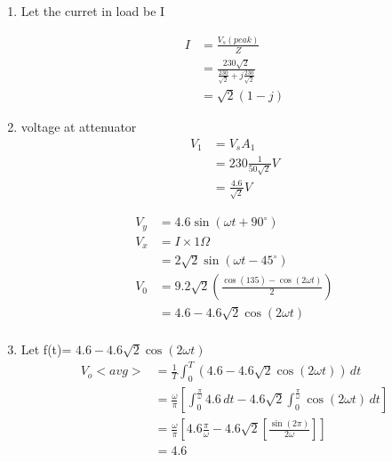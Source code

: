 \documentclass[journal,12pt,twocolumn]{IEEEtran}
\theoremstyle{remark}
\begin{document}

\begin{enumerate}
    \item 

Let the curret in load be I

\begin{center}
\begin{align}
     I &=\frac{V_s(peak)}{Z}\\
     &=\frac{230\sqrt{2}}{\frac{230}{\sqrt{2}}+j\frac{230}{\sqrt{2}}} \\
     &=\sqrt{2}(1-j)
\end{align}
\end{center}
\item
voltage at attenuator 
\begin{align}
    V_1&=V_sA_1\\
    &=230\frac{1}{50\sqrt{2}}V\\
    &=\frac{4.6}{\sqrt{2}}V
\end{align}

\begin{center}
    \begin{align}
        V_y&=4.6\sin(\omega t+90^\circ)\\
        V_x&=I\times 1\Omega\\
        &=2\sqrt{2}\sin(\omega t-45^\circ)\\
        V_0&=9.2\sqrt{2}(\frac{\cos(135)-\cos(2\omega t)}{2})\\
        &=4.6-4.6\sqrt{2}\cos(2\omega t)\\
    \end{align}
\end{center}

\item 
Let f(t)= $4.6-4.6\sqrt{2}\cos(2\omega t)$
\begin{align}
    V_o<avg>&=\frac{1}{T}\int_{0}^{T}(4.6-4.6\sqrt{2}\cos(2\omega t))\,dt\\
    &=\frac{\omega}{\pi} \left[\int_{0}^{\frac{\pi}{\omega}}4.6\,dt-4.6\sqrt{2}\int_{0}^{\frac{\pi}{\omega}}\cos(2\omega t)\,dt\right]\\
    &=\frac{\omega}{\pi}\left[4.6\frac{\pi}{\omega}-4.6\sqrt{2}\left[\frac{\sin(2\pi )}{2\omega}\right]\right]\\
    &=4.6
\end{align}
\end{enumerate}
\end{document}
